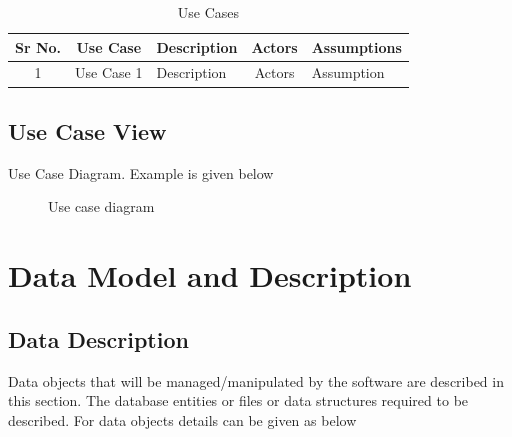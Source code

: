 \documentclass[oneside,a4paper,12pt]{report}
\begin{document}
\begin{table}[!htbp]
\begin{center}
\def\arraystretch{1.5}
\begin{tabularx}{\textwidth}{| c | c | X | c | X |}
\hline
Sr No.	& Use Case	& Description	& Actors	& Assumptions \\
\hline
1& Use Case 1 & Description & Actors & Assumption \\
\hline
\end{tabularx}
\end{center}
\caption{Use Cases}
\label{tab:usecase}
\end{table}


\subsection{Use Case View}
Use Case Diagram. Example is given below
\begin{center}
	\begin{figure}[!htbp]
		\centering
	  \caption{Use case diagram}
	  \label{fig:usecase}
	\end{figure}
\end{center}  

\section{Data Model and Description}  
\subsection{Data Description}  
Data objects that will be managed/manipulated by the software are described in this section. The database entities or files or data structures  required to be described. For data objects details can be given as below
\end{document}
